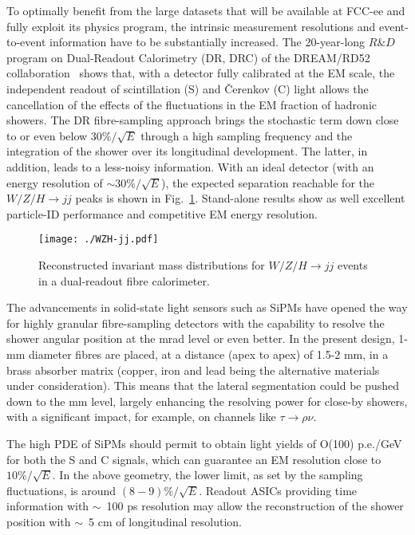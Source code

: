To optimally benefit from the large datasets that will be available at FCC-ee and fully exploit its physics program, the intrinsic measurement resolutions and event-to-event information have to be substantially increased. The 20-year-long $R\&D$ program on Dual-Readout Calorimetry (DR, DRC) of the DREAM/RD52 collaboration~\cite{DRC_Wigmans,RD52_emshow,RD52_emperf,RD52_hadperf,RD52_MC,RD52_PID,RD52_SiPM,IDEA_SiPM} shows that, with a detector fully calibrated at the EM scale, the independent readout of scintillation (S) and \v{C}erenkov (C) light allows the cancellation of the effects of the fluctuations in the EM fraction of hadronic showers. The DR fibre-sampling approach brings the stochastic term down close to or even below $30\%/\sqrt{E}$ through a high sampling frequency and the integration of the shower over its longitudinal development. The latter, in addition, leads to a less-noisy information.
With an ideal detector (with an energy resolution of $\sim 30\%/\sqrt{E}$), the expected separation reachable for the $W/Z/H \rightarrow jj$ peaks is shown in Fig.~\ref{fig:WZH-jj}.
Stand-alone results show as well excellent particle-ID performance and competitive EM energy resolution.

\begin{figure}
    \centering
    \resizebox{0.7\textwidth}{!}
        {\texttt{[image: ./WZH-jj.pdf]}} 
    \caption{Reconstructed invariant mass distributions for  
    $W/Z/H \rightarrow jj$ events in a dual-readout fibre calorimeter.
    }
    \label{fig:WZH-jj}
\end{figure}

The advancements in solid-state light sensors such as SiPMs have opened the way for highly granular fibre-sampling detectors with the capability to resolve the shower angular position at the mrad level or even better.
In the present design, 1-mm diameter fibres are placed, at a distance (apex to apex) of 1.5-2 mm, in a brass absorber matrix (copper, iron and lead being the alternative materials under consideration). This means that the lateral segmentation could be pushed down to the mm level, largely enhancing the resolving power for close-by showers, with a significant impact, for example, on channels like $\tau \rightarrow \rho \nu$.

The high PDE of SiPMs should permit to obtain light yields of O(100) p.e./GeV for both the S and C signals, which can guarantee an EM resolution close to $10\%/\sqrt{E}$. In the above geometry, the lower limit, as set by the sampling fluctuations, is around $(8-9)\%/\sqrt{E}$.
Readout ASICs providing time information with $\sim$~100 ps resolution may allow the reconstruction of the shower position with $\sim$~5 cm of longitudinal resolution.

